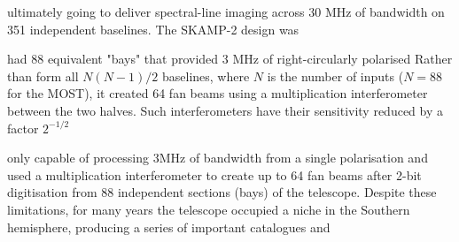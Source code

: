 ultimately going to deliver spectral-line imaging across 30 MHz of bandwidth on 351 independent baselines\cite{Adams_2004}. The SKAMP-2 design was 


had 88 equivalent "bays" that provided 3 MHz of right-circularly polarised Rather than form all $N(N-1)/2$ baselines, where $N$ is the number of inputs ($N=88$ for the MOST), it created 64 fan beams using a multiplication interferometer between the two halves. Such interferometers have their sensitivity reduced by a factor $2^{-1/2}$ 

only capable of processing 3MHz of bandwidth from a single polarisation and used a multiplication interferometer to create up to 64 fan beams after 2-bit digitisation from 88 independent sections (bays) of the telescope. Despite these limitations, for many years the telescope occupied a niche in the Southern hemisphere, producing a series of important catalogues and  

